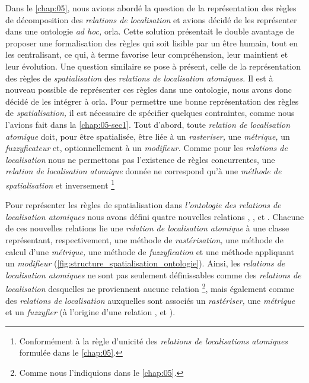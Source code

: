 Dans le \autoref{chap:05}, nous avions abordé la question de la
représentation des règles de décomposition des \emph{relations de
  localisation} et avions décidé de les représenter dans une ontologie
\emph{ad hoc,} \ac{orla}. Cette solution présentait le double avantage
de proposer une formalisation des règles qui soit lisible par un être
humain, tout en les centralisant, ce qui, à terme favorise leur
compréhension, leur maintient et leur évolution. Une question
similaire se pose à présent, celle de la représentation des règles de
\emph{spatialisation} des \emph{relations de localisation atomiques.}
Il est à nouveau possible de représenter ces règles dans une
ontologie, nous avons donc décidé de les intégrer à \ac{orla}. Pour
permettre une bonne représentation des règles de
\emph{spatialisation,} il est nécessaire de spécifier quelques
contraintes, comme nous l'avions fait dans la
\autoref{chap:05-sec1}. Tout d'abord, toute \emph{relation de
  localisation atomique} doit, pour être spatialisée, être liée à un
\emph{rasteriser,} une \emph{métrique,} un \emph{fuzzyficateur} et,
optionnellement à un \emph{modifieur.} Comme pour les \emph{relations
  de localisation} nous ne permettons pas l’existence de règles
concurrentes, une \emph{relation de localisation atomique} donnée
ne correspond qu'à une \emph{méthode de spatialisation} et inversement
\footnote{Conformément à la règle d'unicité des \emph{relations de
  localisations atomiques} formulée dans le \autoref{chap:05}.}

Pour représenter les règles de spatialisation dans \emph{l'ontologie
  des relations de localisation atomiques} nous avons défini quatre
nouvelles relations ,
,  et
. Chacune de ces nouvelles relations lie
une \emph{relation de localisation atomique} à une classe
représentant, respectivement, une méthode de \emph{rastérisation,} une
méthode de calcul d'une \emph{métrique,} une méthode de
\emph{fuzzyfication} et une méthode appliquant un \emph{modifieur}
(\autoref{fig:structure_spatialisation_ontologie}). Ainsi, les
\emph{relations de localisation atomiques} ne sont pas seulement
définissables comme des \emph{relations de localisation} desquelles ne
proviennent aucune relation
 \footnote{Comme nous
  l'indiquions dans le \autoref{chap:05}.}, mais également comme des
\emph{relations de localisation} auxquelles sont associés un
\emph{rastériser,} une \emph{métrique} et un \emph{fuzzyfier} (\ie à
l'origine d'une relation ,
 et ).

